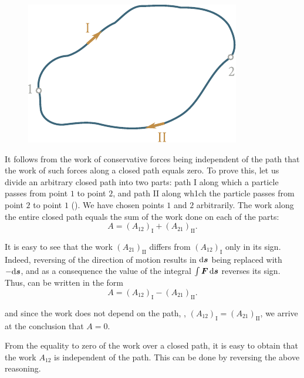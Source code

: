\begin{figure}[t]
	\begin{center}
		\includegraphics[scale=1]{figures/ch_03/fig_3_5.pdf}
		\caption[]{}
		\label{fig:3_5}
	\end{center}
\vspace{-0.7cm}
\end{figure}

It follows from the work of conservative forces being independent of the path that the work of such forces along a closed path equals zero. To prove this, let us divide an arbitrary closed path into two parts: path I along which a particle passes from point $1$ to point $2$, and path II along wh1ch the particle passes from point $2$ to point $1$ (). We have chosen points $1$ and $2$ arbitrarily. The work along the entire closed path equals the sum of the work done on each of the parts:
\begin{equation}\label{eq:3_22}
A = (A_{12})_{\text{I}} + (A_{21})_{\text{II}}.
\end{equation}

\noindent
It is easy to see that the work $(A_{21})_{\text{II}}$ differs from $(A_{12})_{\text{I}}$ only in its sign. Indeed, reversing of the direction of motion results in $\mathrm{d}\boldsymbol{s}$ being replaced with $-\mathrm{d}\boldsymbol{s}$, and as a consequence the value of the integral $\int\boldsymbol{F}\,\mathrm{d}\boldsymbol{s}$ reverses its sign. Thus,  can be written in the form
\begin{equation*}
A = (A_{12})_{\text{I}} - (A_{21})_{\text{II}}.
\end{equation*}

\noindent
and since the work does not depend on the path, \ie, $(A_{12})_{\text{I}}=(A_{21})_{\text{II}}$, we arrive at the conclusion that $A=0$.

From the equality to zero of the work over a closed path, it is easy to obtain that the work $A_{12}$ is independent of the path. This can be done by reversing the above reasoning.

